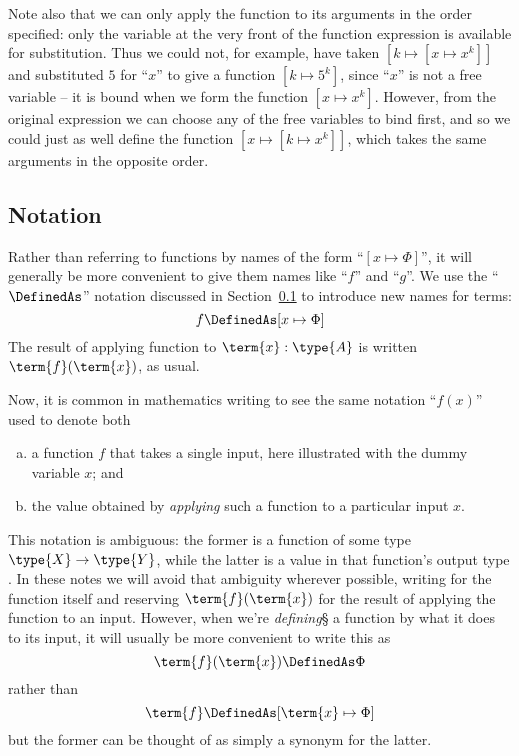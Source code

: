 Note also that we can only apply the function to its arguments in the order specified: only the variable at the very front of the function expression is available for substitution.  Thus we could not, for example, have taken $[k \mapsto [x \mapsto x^k]]$ and substituted $5$ for ``$x$'' to give a function 
$[k \mapsto 5^k]$, since ``$x$'' is not a free variable -- it is bound when we form the function $[x \mapsto x^k]$.
However, from the original expression we can choose any of the free variables to bind first, and so we could just as well define the function
$[x \mapsto [k \mapsto x^k]]$, which takes the same arguments in the opposite order.











\subsection{Notation}


Rather than referring to functions by names of the form ``$[x \mapsto \Phi]$'', it will generally be more convenient to give them names like ``$f$'' and ``$g$''.  We use the ``$\DefinedAs$'' notation discussed in Section~\ref{} to introduce new names for terms:
\[
f \DefinedAs [x \mapsto \Phi]
\]
The result of applying function  to $\term{x}:\type{A}$ is written $\term{f}(\term{x})$, as usual.


Now, it is common in mathematics writing to see the same notation ``$f(x)$'' used to denote both 
\begin{enumerate}[(a)]
\item a function $f$ that takes a single input, here illustrated with the dummy variable $x$; and
\item the value obtained by \emph{applying} such a function to a particular input $x$.
\end{enumerate}
 
This notation is ambiguous: the former is a function of some type $\type{X} \to \type{Y}$, while the latter is a value in that function's output type .  In these notes we will avoid that ambiguity wherever possible, writing  for the function itself and reserving $\term{f}(\term{x})$ for the result of applying the function to an input.  However, when we're \emph{defining}§ a function by what it does to its input, it will usually be more convenient to write this as
\[
\term{f}(\term{x}) \DefinedAs \Phi
\]
rather than
\[
\term{f} \DefinedAs [\term{x} \mapsto \Phi]
\]
but the former can be thought of as simply a synonym for the latter.

